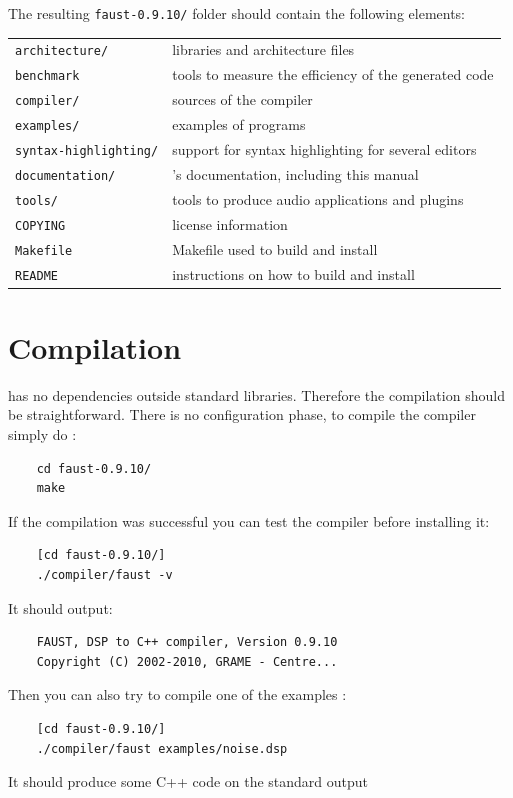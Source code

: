\documentclass[a4paper]{book}
\begin{document}
The resulting  \lstinline'faust-0.9.10/' folder should contain the following elements:

\begin{tabular}{ll}
	\lstinline'architecture/' 		&\faust libraries and architecture files\\
	\lstinline'benchmark'			&tools to measure the efficiency of the generated code\\
	\lstinline'compiler/'			&sources of the \faust compiler\\
	\lstinline'examples/'			&examples of \faust programs\\
	\lstinline'syntax-highlighting/'&	support for syntax highlighting for several editors\\
	\lstinline'documentation/' 		&\faust's documentation, including this manual\\
	\lstinline'tools/'				&tools to produce audio applications and plugins\\
	\lstinline'COPYING'				&license information\\
	\lstinline'Makefile'			&Makefile used to build and install \faust\\
	\lstinline'README'				&instructions on how to build and install \faust
\end{tabular}

\section{Compilation}
\faust has no dependencies outside standard libraries. Therefore the compilation should be straightforward. There is no configuration phase, to compile the \faust compiler simply do :
\begin{lstlisting}
	cd faust-0.9.10/
	make
\end{lstlisting}

If the compilation was successful you can test the compiler before installing it:
\begin{lstlisting}
	[cd faust-0.9.10/]
	./compiler/faust -v
\end{lstlisting}
It should output:
\begin{lstlisting}
	FAUST, DSP to C++ compiler, Version 0.9.10
	Copyright (C) 2002-2010, GRAME - Centre... 
\end{lstlisting}

Then you can also try to compile one of the examples :
\begin{lstlisting}
	[cd faust-0.9.10/]
	./compiler/faust examples/noise.dsp
\end{lstlisting}
It should produce some C++ code on the standard output
\end{document}
